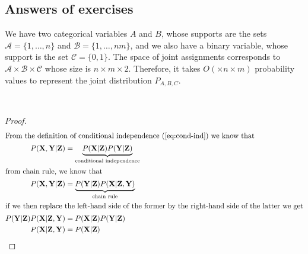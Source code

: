 \subsection{Answers of exercises}

\begin{Answer}[ref=ABC]
We have two categorical variables $A$ and $B$, whose supports are the sets $\mathcal A = \{1, \ldots, n\}$ and $\mathcal B = \{1, \ldots, nm\}$, and we also have a binary variable, whose support is the set $\mathcal C = \{0, 1\}$. The space of joint assignments corresponds to $\mathcal A \times \mathcal B \times \mathcal C$ whose size is $n \times m \times 2$. Therefore, it takes $O(\times n \times m)$ probability values to represent the joint distribution $P_{A,B,C}$.
\end{Answer}

~

\begin{Answer}[ref=cond-ind]

\begin{proof}
\begin{subequations}
\begin{align}
\intertext{From the definition of conditional independence  (\ref{eq:cond-ind})  we know that } 
P(\mathbf X, \mathbf Y| \mathbf Z) &= \underbrace{P(\mathbf X|\mathbf Z) P(\mathbf Y| \mathbf Z)}_{\text{conditional independence}} \\
\intertext{from chain rule, we know that}
P(\mathbf X, \mathbf Y| \mathbf Z) &= \underbrace{P(\mathbf Y|\mathbf Z) P(\mathbf X| \mathbf Z, \mathbf Y)}_{\text{chain rule}} \\
\intertext{if we then replace the left-hand side of the former by the right-hand side of the latter we get}
P(\mathbf Y|\mathbf Z) P(\mathbf X| \mathbf Z, \mathbf Y) &= P(\mathbf X|\mathbf Z) P(\mathbf Y| \mathbf Z) \\
P(\mathbf X| \mathbf Z, \mathbf Y) &= P(\mathbf X|\mathbf Z)
\end{align}
\end{subequations}
\end{proof}

\end{Answer}

~

